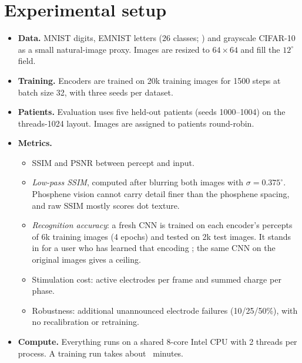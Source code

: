 \section{Experimental setup}
\begin{itemize}
\item \textbf{Data.} MNIST digits, EMNIST letters (26 classes; \citealp{cohen2017emnist}) and grayscale CIFAR-10 as a small natural-image proxy. Images are resized to $64{\times}64$ and fill the $12^\circ$ field.
\item \textbf{Training.} Encoders are trained on 20k training images for 1500 steps at batch size 32, with three seeds per dataset.
\item \textbf{Patients.} Evaluation uses five held-out patients (seeds 1000--1004) on the threads-1024 layout. Images are assigned to patients round-robin.
\item \textbf{Metrics.}
  \begin{itemize}
  \item SSIM \citep{wang2004image} and PSNR between percept and input.
  \item \emph{Low-pass SSIM}, computed after blurring both images with $\sigma{=}0.375^\circ$. Phosphene vision cannot carry detail finer than the phosphene spacing, and raw SSIM mostly scores dot texture.
  \item \emph{Recognition accuracy}: a fresh CNN is trained on each encoder's percepts of 6k training images (4 epochs) and tested on 2k test images. It stands in for a user who has learned that encoding \citep{rassia2018improvement}; the same CNN on the original images gives a ceiling.
  \item Stimulation cost: active electrodes per frame and summed charge per phase.
  \item Robustness: additional unannounced electrode failures (10/25/50\%), with no recalibration or retraining.
  \end{itemize}
\item \textbf{Compute.} Everything runs on a shared 8-core Intel CPU with 2 threads per process. A training run takes about \NumTrainMin\ minutes.
\end{itemize}

